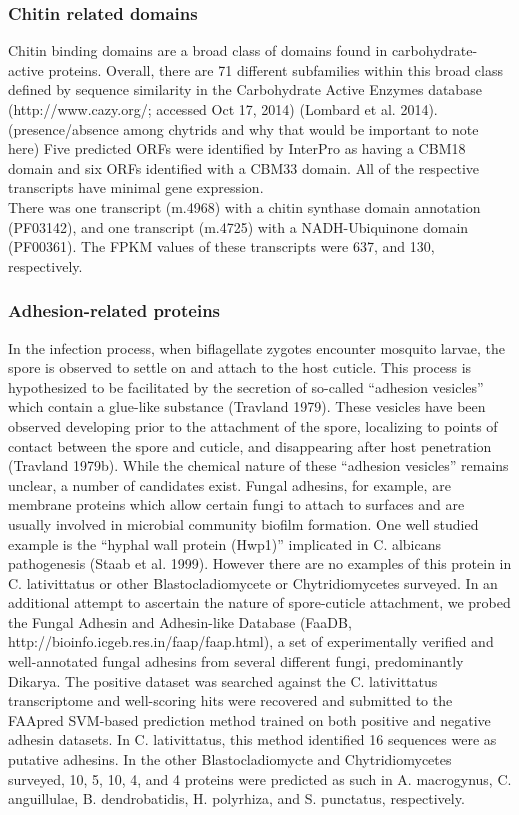 \subsubsection{Chitin related domains}
Chitin binding domains are a broad class of domains found in carbohydrate-active proteins. Overall, there are 71 different subfamilies within this broad class defined by sequence similarity in the Carbohydrate Active Enzymes database (http://www.cazy.org/; accessed Oct 17, 2014) (Lombard et al. 2014). (presence/absence among chytrids and why that would be important to note here) Five predicted ORFs were identified by InterPro as having a CBM18 domain and six ORFs identified with a CBM33 domain. All of the respective transcripts have minimal gene expression. \\
\indent There was one transcript (m.4968) with a chitin synthase domain annotation (PF03142), and one transcript (m.4725) with a NADH-Ubiquinone domain (PF00361). The FPKM values of these transcripts were 637, and 130, respectively.
\subsubsection{Adhesion-related proteins}
In the infection process, when biflagellate zygotes encounter mosquito larvae, the spore is observed to settle on and attach to the host cuticle. This process is hypothesized to be facilitated by the secretion of so-called “adhesion vesicles” which contain a glue-like substance (Travland 1979). These vesicles have been observed developing prior to the attachment of the spore, localizing to points of contact between the spore and cuticle, and disappearing after host penetration (Travland 1979b). While the chemical nature of these “adhesion vesicles” remains unclear, a number of candidates exist. Fungal adhesins, for example, are membrane proteins which allow certain fungi to attach to surfaces and are usually involved in microbial community biofilm formation. One well studied example is the “hyphal wall protein (Hwp1)” implicated in C. albicans pathogenesis (Staab et al. 1999). However there are no examples of this protein in C. lativittatus or other Blastocladiomycete or Chytridiomycetes surveyed. In an additional attempt to ascertain the nature of spore-cuticle attachment, we probed the Fungal Adhesin and Adhesin-like Database (FaaDB, http://bioinfo.icgeb.res.in/faap/faap.html), a set of experimentally verified and well-annotated fungal adhesins from several different fungi, predominantly Dikarya. The positive dataset was searched against the C. lativittatus transcriptome and well-scoring hits were recovered and submitted to the FAApred SVM-based prediction method trained on both positive and negative adhesin datasets. In C. lativittatus, this method identified 16 sequences were as putative adhesins. In the other Blastocladiomycte and Chytridiomycetes surveyed, 10, 5, 10, 4, and 4 proteins were predicted as such in A. macrogynus, C. anguillulae, B. dendrobatidis, H. polyrhiza, and S. punctatus, respectively. 
